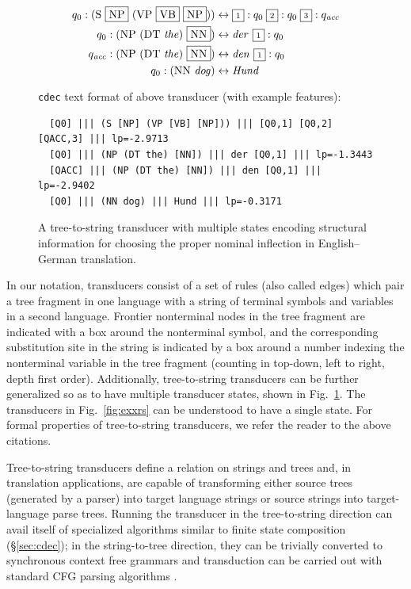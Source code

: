 \documentclass[nofonts]{pbml} %
\begin{document}
\begin{figure}
\begin{small}
\begin{align*}
q_0 : \textrm{(S \fbox{NP} (VP \fbox{VB} \fbox{NP}))} &\leftrightarrow \scriptsize{\fbox{1}}:q_0\ \scriptsize{\fbox{2}}:q_0\ \scriptsize{\fbox{3}}:q_{\textrm{\emph{acc}}} \\
q_0 : \textrm{(NP (DT \emph{the}) \fbox{NN})} &\leftrightarrow \textrm{\emph{der }}  \scriptsize{\fbox{1}}:q_0 \\
q_{\textrm{\emph{acc}}} : \textrm{(NP (DT \emph{the}) \fbox{NN})} &\leftrightarrow \textrm{\emph{den }}  \scriptsize{\fbox{1}}:q_0 \\
q_0 : \textrm{(NN \emph{dog})} &\leftrightarrow \textrm{\emph{Hund}}
\end{align*}
\end{small}
{\tt cdec} text format of above transducer (with example features):
\begin{small}
\begin{verbatim}
  [Q0] ||| (S [NP] (VP [VB] [NP])) ||| [Q0,1] [Q0,2] [QACC,3] ||| lp=-2.9713
  [Q0] ||| (NP (DT the) [NN]) ||| der [Q0,1] ||| lp=-1.3443
  [QACC] ||| (NP (DT the) [NN]) ||| den [Q0,1] ||| lp=-2.9402
  [Q0] ||| (NN dog) ||| Hund ||| lp=-0.3171
\end{verbatim}
\end{small}
\caption{\label{fig:multistate}A tree-to-string transducer with multiple states encoding structural information for choosing the proper nominal inflection in English--German translation.}
\end{figure}
In our notation, transducers consist of a set of rules (also called edges) which pair a tree fragment in one language with a string of terminal symbols and variables in a second language. Frontier nonterminal nodes in the tree fragment are indicated with a box around the nonterminal symbol, and the corresponding substitution site in the string is indicated by a box around a number indexing the nonterminal variable in the tree fragment (counting in top-down, left to right, depth first order). Additionally, tree-to-string transducers can be further generalized so as to have multiple transducer states, shown in Fig.~\ref{fig:multistate}. The transducers in Fig.~\ref{fig:exxrs} can be understood to have a single state. For formal properties of tree-to-string transducers, we refer the reader to the above citations. 

Tree-to-string transducers define a relation on strings and trees and, in translation applications, are capable of transforming either source trees (generated by a parser) into target language strings or source strings into target-language parse trees. Running the transducer in the tree-to-string direction can avail itself of specialized algorithms similar to finite state composition (\S\ref{sec:cdec}); in the string-to-tree direction, they can be trivially converted to synchronous context free grammars and transduction can be carried out with standard CFG parsing algorithms \citep{Galley2004}.
\end{document}
